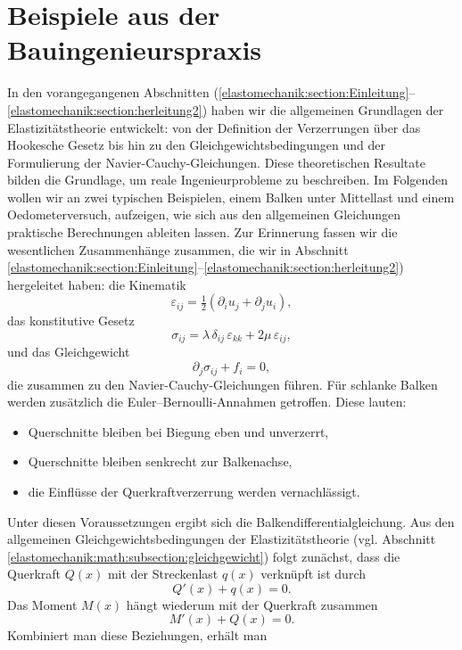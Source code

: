 %
%
%
%
\section{Beispiele aus der Bauingenieurspraxis}
\label{elastomechanik:section:teil4}
In den vorangegangenen Abschnitten
(\ref{elastomechanik:section:Einleitung}--\ref{elastomechanik:section:herleitung2})
haben wir die allgemeinen Grundlagen der Elastizitätstheorie entwickelt: 
von der Definition der Verzerrungen über das Hookesche Gesetz bis hin zu den Gleichgewichtsbedingungen und der Formulierung der Navier-Cauchy-Gleichungen. 
Diese theoretischen Resultate bilden die Grundlage, um reale Ingenieurprobleme zu beschreiben. 
Im Folgenden wollen wir an zwei typischen Beispielen, einem Balken unter Mittellast und einem Oedometerversuch, aufzeigen, wie sich aus den allgemeinen Gleichungen praktische Berechnungen ableiten lassen. 
Zur Erinnerung fassen wir die wesentlichen Zusammenhänge zusammen,
die wir in Abschnitt
\ref{elastomechanik:section:Einleitung}--\ref{elastomechanik:section:herleitung2})
hergeleitet haben:
die Kinematik
\[
  \varepsilon_{ij} = \tfrac12(\partial_i u_j + \partial_j u_i),
\]
das konstitutive Gesetz
\[
  \sigma_{ij} = \lambda\, \delta_{ij}\,\varepsilon_{kk} + 2\mu\, \varepsilon_{ij},
\]
und das Gleichgewicht
\[
  \partial_j \sigma_{ij} + f_i = 0,
\]
die zusammen zu den Navier-Cauchy-Gleichungen führen.
Für schlanke Balken werden zusätzlich die Euler–Bernoulli-Annahmen getroffen. 
Diese lauten:
\begin{itemize}
  \item Querschnitte bleiben bei Biegung eben und unverzerrt,
  \item Querschnitte bleiben senkrecht zur Balkenachse,
  \item die Einflüsse der Querkraftverzerrung werden vernachlässigt.
\end{itemize}
Unter diesen Voraussetzungen ergibt sich die Balkendifferentialgleichung. 
Aus den allgemeinen Gleichgewichtsbedingungen der Elastizitätstheorie 
(vgl. Abschnitt
\ref{elastomechanik:math:subsection:gleichgewicht})
folgt zunächst, dass die Querkraft \(Q(x)\) mit der 
Streckenlast \(q(x)\) verknüpft ist durch
\[
  Q'(x) + q(x) = 0.
\]
Das Moment \(M(x)\) hängt wiederum mit der Querkraft zusammen
\[
  M'(x) + Q(x) = 0.
\]
Kombiniert man diese Beziehungen, erhält man
